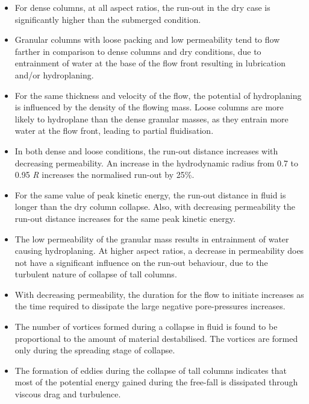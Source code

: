 \begin{itemize}

\item For dense columns, at all aspect ratios, the run-out in 
the dry case is significantly higher than the submerged condition.

\item Granular columns with loose packing and low permeability tend to flow 
farther in comparison to dense columns and dry conditions, due to entrainment 
of water at the base of the flow front resulting in lubrication and/or 
hydroplaning.

\item For the same thickness and velocity of the flow, the potential of 
hydroplaning is influenced by the density of the flowing mass. Loose columns 
are more likely to hydroplane than the dense granular masses, as they entrain 
more water at the flow front, leading to partial fluidisation. 

\item In both dense and loose conditions, the run-out distance increases 
with decreasing permeability. An increase in the hydrodynamic radius from 
0.7 to 0.95 \textit{R} increases the normalised run-out by 25\%. 

\item For the same value of peak kinetic energy, the run-out distance in fluid 
is longer than the dry column collapse. Also, with decreasing permeability the 
run-out distance increases for the same peak kinetic energy. 

\item The low permeability of the granular mass results in entrainment of water 
causing hydroplaning. At higher aspect ratios, a decrease in permeability does 
not have a significant influence on the run-out behaviour, due to the turbulent 
nature of collapse of tall columns.

\item With decreasing permeability, the duration for the flow to 
initiate increases as the time required to dissipate the large negative 
pore-pressures increases. 

\item The number of vortices formed during a collapse in fluid is found to be 
proportional to the amount of material destabilised. The vortices are formed 
only during the spreading stage of collapse.

\item The formation of eddies during the collapse of tall columns indicates 
that most of the potential energy gained during the free-fall is dissipated 
through viscous drag and turbulence. 



\end{itemize}
